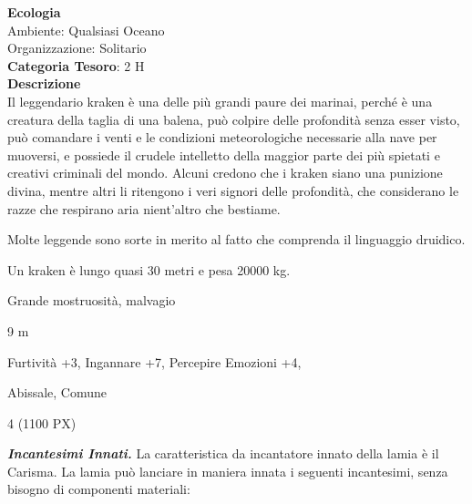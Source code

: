 \begin{multicols}{2}
{\textbf{Ecologia}\\
Ambiente: Qualsiasi Oceano\\
Organizzazione: Solitario\\
\textbf{Categoria Tesoro}: 2 H\\
\textbf{Descrizione}\\
Il leggendario kraken è una delle più grandi paure dei marinai, perché è una creatura della taglia di una balena, può colpire delle profondità senza esser visto, può comandare i venti e le condizioni meteorologiche necessarie alla nave per muoversi, e possiede il crudele intelletto della maggior parte dei più spietati e creativi criminali del mondo. Alcuni credono che i kraken siano una punizione divina, mentre altri li ritengono i veri signori delle profondità, che considerano le razze che respirano aria nient'altro che bestiame.

Molte leggende sono sorte in merito al fatto che comprenda il linguaggio druidico.

Un kraken è lungo quasi 30 metri e pesa 20000 kg.


\begin{description}[noitemsep, topsep=0pt, parsep=0pt, partopsep=0pt, itemsep=1pt, leftmargin=2.35cm,  labelwidth=2.2cm, itemindent=0cm, listparindent=0pt] %
\setlength{\baselineskip}{10pt}
\item[\textbf{Taglia/Tipo}] Grande mostruosità, malvagio
\item[\textbf{Caratt.}] 
\item[\textbf{Punti Ferita}] 
\item[\textbf{Movimento}] 9 m
\item[\textbf{Tiri Salvez.}] 
\item[\textbf{Comp.}] Furtività +3, Ingannare +7, Percepire Emozioni +4,
\item[\textbf{Sensi}] 
\item[\textbf{Linguaggi}] Abissale, Comune
\item[\textbf{Sfida}] 4 (1100 PX)
\end{description}
\smallskip

\emph{\textbf{Incantesimi Innati.}} La caratteristica da incantatore innato della lamia è il Carisma. La lamia può lanciare in maniera innata i seguenti incantesimi, senza bisogno di componenti materiali:

}
\end{multicols}
